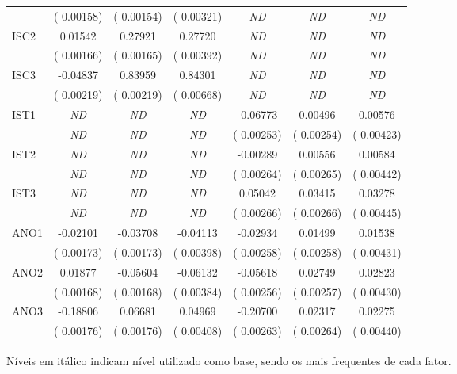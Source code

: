 {\begin{center}
\begin{table}
\begin{threeparttable}
\begin{tabular}{lcccccc}
        & \tiny{( 0.00158)} & \tiny{( 0.00154)} & \tiny{( 0.00321)} & \tiny{\textit{ND}} & \tiny{\textit{ND}} & \tiny{\textit{ND}} \\
        ISC2 &  0.01542 &  0.27921 &  0.27720 & \textit{ND} & \textit{ND} & \textit{ND} \\
        & \tiny{( 0.00166)} & \tiny{( 0.00165)} & \tiny{( 0.00392)} & \tiny{\textit{ND}} & \tiny{\textit{ND}} & \tiny{\textit{ND}} \\
        ISC3 & -0.04837 &  0.83959 &  0.84301 & \textit{ND} & \textit{ND} & \textit{ND} \\
        & \tiny{( 0.00219)} & \tiny{( 0.00219)} & \tiny{( 0.00668)} & \tiny{\textit{ND}} & \tiny{\textit{ND}} & \tiny{\textit{ND}} \\
        IST1 & \textit{ND} & \textit{ND} & \textit{ND} & -0.06773 &  0.00496 &  0.00576 \\
        & \tiny{\textit{ND}} & \tiny{\textit{ND}} & \tiny{\textit{ND}} & \tiny{( 0.00253)} & \tiny{( 0.00254)} & \tiny{( 0.00423)} \\
        IST2 & \textit{ND} & \textit{ND} & \textit{ND} & -0.00289 &  0.00556 &  0.00584 \\
        & \tiny{\textit{ND}} & \tiny{\textit{ND}} & \tiny{\textit{ND}} & \tiny{( 0.00264)} & \tiny{( 0.00265)} & \tiny{( 0.00442)} \\
        IST3 & \textit{ND} & \textit{ND} & \textit{ND} &  0.05042 &  0.03415 &  0.03278 \\
        & \tiny{\textit{ND}} & \tiny{\textit{ND}} & \tiny{\textit{ND}} & \tiny{( 0.00266)} & \tiny{( 0.00266)} & \tiny{( 0.00445)} \\
        ANO1 & -0.02101 & -0.03708 & -0.04113 & -0.02934 &  0.01499 &  0.01538 \\
        & \tiny{( 0.00173)} & \tiny{( 0.00173)} & \tiny{( 0.00398)} & \tiny{( 0.00258)} & \tiny{( 0.00258)} & \tiny{( 0.00431)} \\
        ANO2 &  0.01877 & -0.05604 & -0.06132 & -0.05618 &  0.02749 &  0.02823 \\
        & \tiny{( 0.00168)} & \tiny{( 0.00168)} & \tiny{( 0.00384)} & \tiny{( 0.00256)} & \tiny{( 0.00257)} & \tiny{( 0.00430)} \\
        ANO3 & -0.18806 &  0.06681 &  0.04969 & -0.20700 &  0.02317 &  0.02275 \\
        & \tiny{( 0.00176)} & \tiny{( 0.00176)} & \tiny{( 0.00408)} & \tiny{( 0.00263)} & \tiny{( 0.00264)} & \tiny{( 0.00440)} \\
        \bottomrule
        \end{tabular}
        \begin{tablenotes}
        \scriptsize
        \item Níveis em itálico indicam nível utilizado como base, sendo os mais frequentes de cada fator.
        \end{tablenotes}
    \end{threeparttable}
\end{table}
\end{center}
}
